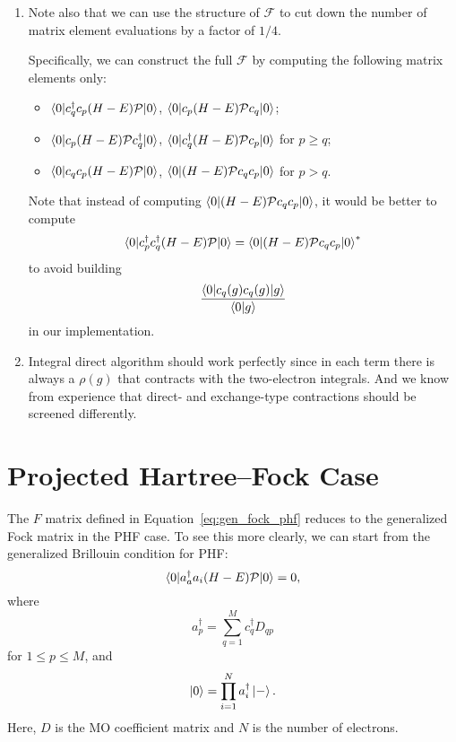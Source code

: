 \documentclass[11pt,letterpaper]{article}
\begin{document}
\begin{enumerate}
  \item Note also that we can use the structure of $\mathcal{F}$ to cut down the number
    of matrix element evaluations by a factor of $1/4$.

    Specifically, we can construct the full $\mathcal{F}$ by computing the following matrix elements only:
    \begin{itemize}
      \item $\braket{0|c^\dag_q c_p (H - E) \mathcal{P}|0}$,
        $\braket{0|c_p (H - E) \mathcal{P} c_q|0}$;
      \item $\braket{0|c_p (H - E) \mathcal{P} c^\dag_q|0}$,
        $\braket{0|c^\dag_q (H - E) \mathcal{P} c_p|0}$ for $p \geq q$;
      \item $\braket{0|c_q c_p (H - E) \mathcal{P}|0}$,
        $\braket{0|(H - E) \mathcal{P} c_q c_p|0}$ for $p > q$.
    \end{itemize}

    Note that instead of computing $\braket{0|(H - E) \mathcal{P} c_q c_p|0}$,
    it would be better to compute 
    \begin{equation}
      \braket{0|c^\dag_p c^\dag_q (H - E) \mathcal{P}|0}
      = \braket{0|(H - E) \mathcal{P} c_q c_p|0}^*
    \end{equation}
    to avoid building
    \begin{equation*}
      \frac{\braket{0|c_q(g) c_q(g)|g}}{\braket{0|g}}
    \end{equation*}
    in our implementation.
    
  \item Integral direct algorithm should work perfectly since in each term there is always a $\rho(g)$
    that contracts with the two-electron integrals. And we know from experience that direct- and
    exchange-type contractions should be screened differently.
\end{enumerate}

\section{Projected Hartree--Fock Case}

The $F$ matrix defined in Equation~\eqref{eq:gen_fock_phf} reduces to the generalized Fock matrix
in the PHF case. To see this more clearly, we can start from the generalized Brillouin condition
for PHF:
\begin{equation}
  \braket{0|a^\dag_a a_i (H - E) \mathcal{P}|0} = 0,
\end{equation}
where
\begin{equation}
  a^\dag_p = \sum_{q=1}^M c^\dag_q D_{qp}
\end{equation}
for $1 \leq p \leq M$, and
\begin{equation}
  \ket{0} = \prod_{i=1}^{N} a^\dag_i \ket{-}.
\end{equation}
Here, $D$ is the MO coefficient matrix and $N$ is the number of electrons.
\end{document}
